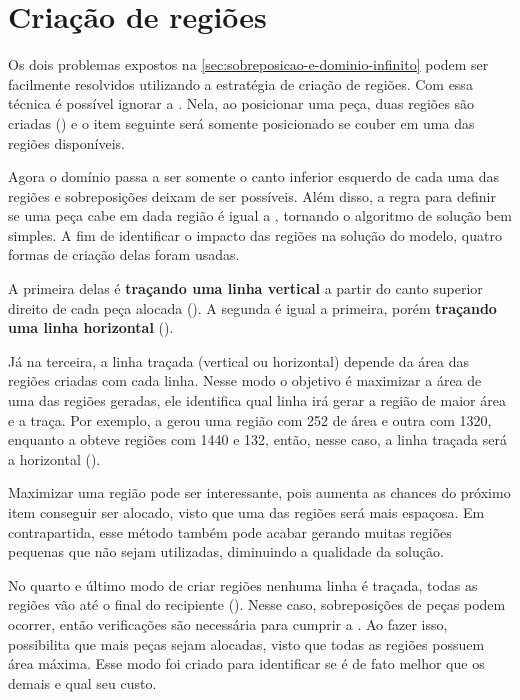 \section{Criação de regiões}\label{sec:criacao-de-regioes}

Os dois problemas expostos na \cref{sec:sobreposicao-e-dominio-infinito} podem ser facilmente
resolvidos utilizando a estratégia de criação de regiões.
Com essa técnica é possível ignorar a .
Nela, ao posicionar uma peça, duas regiões são criadas () e o item
seguinte será somente posicionado se couber em uma das regiões disponíveis.



Agora o domínio passa a ser somente o canto inferior esquerdo de cada uma das regiões e
sobreposições deixam de ser possíveis.
Além disso, a regra para definir se uma peça cabe em dada região é igual a , tornando
o algoritmo de solução bem simples.
A fim de identificar o impacto das regiões na solução do modelo, quatro formas de criação
delas foram usadas.

A primeira delas é \textbf{traçando uma linha vertical} a partir do canto superior direito de cada
peça alocada ().
A segunda é igual a primeira, porém \textbf{traçando uma linha horizontal} ().



Já na terceira, a linha traçada (vertical ou horizontal) depende da área das regiões criadas
com cada linha.
Nesse modo o objetivo é maximizar a área de uma das regiões geradas, ele identifica qual linha
irá gerar a região de maior área e a traça.
Por exemplo, a  gerou uma região com 252 de área e outra com 1320,
enquanto a  obteve regiões com 1440 e 132, então, nesse caso, a linha
traçada será a horizontal ().



Maximizar uma região pode ser interessante, pois aumenta as chances do próximo item conseguir ser
alocado, visto que uma das regiões será mais espaçosa.
Em contrapartida, esse método também pode acabar gerando muitas regiões pequenas que não sejam
utilizadas, diminuindo a qualidade da solução.

No quarto e último modo de criar regiões nenhuma linha é traçada, todas as regiões vão até o final
do recipiente ().
Nesse caso, sobreposições de peças podem ocorrer, então verificações são necessária para cumprir
a .
Ao fazer isso, possibilita que mais peças sejam alocadas, visto que todas as regiões possuem área
máxima.
Esse modo foi criado para identificar se é de fato melhor que os demais e qual seu custo.

